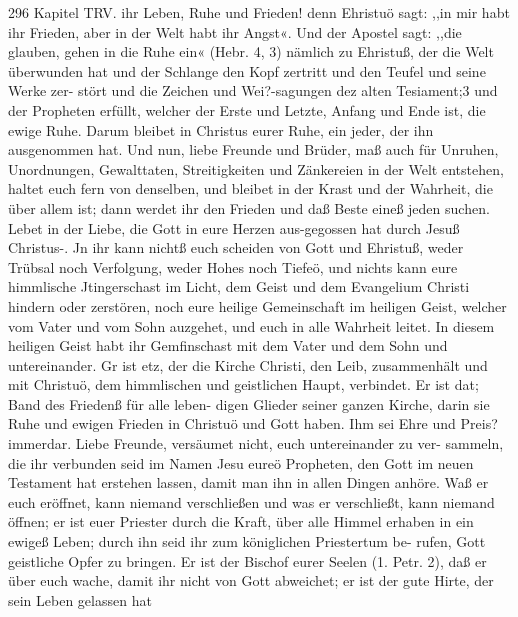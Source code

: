 296 Kapitel TRV.
ihr Leben, Ruhe und Frieden! denn Ehristuö sagt: ,,in mir habt
ihr Frieden, aber in der Welt habt ihr Angst«. Und der
Apostel sagt: ,,die glauben, gehen in die Ruhe ein« (Hebr. 4, 3)
nämlich zu Ehristuß, der die Welt überwunden hat und der
Schlange den Kopf zertritt und den Teufel und seine Werke zer-
stört und die Zeichen und Wei?-sagungen dez alten Tesiament;3
und der Propheten erfüllt, welcher der Erste und Letzte, Anfang
und Ende ist, die ewige Ruhe. Darum bleibet in Christus eurer
Ruhe, ein jeder, der ihn ausgenommen hat.
Und nun, liebe Freunde und Brüder, maß auch für Unruhen,
Unordnungen, Gewalttaten, Streitigkeiten und Zänkereien in der
Welt entstehen, haltet euch fern von denselben, und bleibet in
der Krast und der Wahrheit, die über allem ist; dann werdet ihr
den Frieden und daß Beste eineß jeden suchen. Lebet in der Liebe,
die Gott in eure Herzen aus-gegossen hat durch Jesuß Christus-.
Jn ihr kann nichtß euch scheiden von Gott und Ehristuß, weder
Trübsal noch Verfolgung, weder Hohes noch Tiefeö, und nichts
kann eure himmlische Jtingerschast im Licht, dem Geist und dem
Evangelium Christi hindern oder zerstören, noch eure heilige
Gemeinschaft im heiligen Geist, welcher vom Vater und vom
Sohn auzgehet, und euch in alle Wahrheit leitet. In diesem
heiligen Geist habt ihr Gemfinschast mit dem Vater und dem Sohn
und untereinander. Gr ist etz, der die Kirche Christi, den Leib,
zusammenhält und mit Christuö, dem himmlischen und geistlichen
Haupt, verbindet. Er ist dat; Band des Friedenß für alle leben-
digen Glieder seiner ganzen Kirche, darin sie Ruhe und ewigen
Frieden in Christuö und Gott haben. Ihm sei Ehre und Preis?
immerdar.
Liebe Freunde, versäumet nicht, euch untereinander zu ver-
sammeln, die ihr verbunden seid im Namen Jesu eureö Propheten,
den Gott im neuen Testament hat erstehen lassen, damit man
ihn in allen Dingen anhöre. Waß er euch eröffnet, kann niemand
verschließen und was er verschließt, kann niemand öffnen; er ist
euer Priester durch die Kraft, über alle Himmel erhaben in ein
ewigeß Leben; durch ihn seid ihr zum königlichen Priestertum be-
rufen, Gott geistliche Opfer zu bringen. Er ist der Bischof eurer
Seelen (1. Petr. 2), daß er über euch wache, damit ihr nicht von
Gott abweichet; er ist der gute Hirte, der sein Leben gelassen hat


